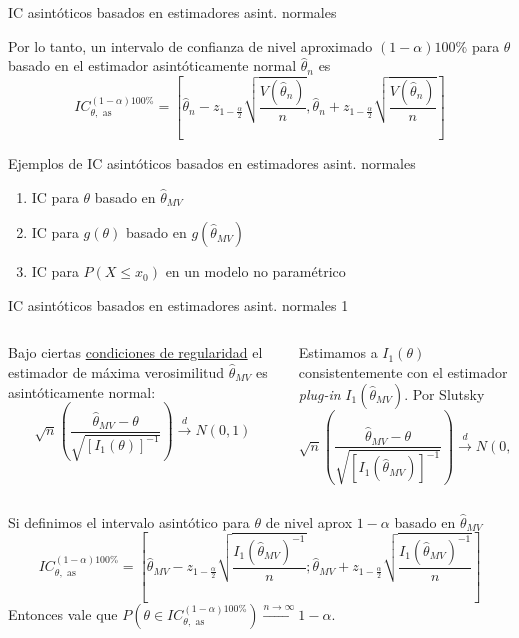 \documentclass{beamer}
\theoremstyle{definition}
\newcommand{\cw}{\overset{d}{\rightarrow}}
\begin{document}
\begin{frame}{\color{rosee}IC asint\'oticos basados en estimadores asint. normales} 

Por lo tanto, un intervalo de confianza de nivel aproximado $(1-\alpha)100\%$ para $\theta$ basado en el estimador asintóticamente normal $\widehat{\theta}_n$ es 
  \[IC_{\theta, \text{ as}}^{(1-\alpha)100\%}=\left[
  \widehat{\theta}_{n} - z_{1-\frac{\alpha}{2}} \sqrt{\frac{V(\widehat{\theta}_{n})}{n}},\widehat{\theta}_{n} + z_{1-\frac{\alpha}{2}} \sqrt{\frac{V(\widehat{\theta}_{n})}{n}}\right]
  \]

  \bigskip
  
Ejemplos de IC asint\'oticos basados en estimadores asint. normales
  \begin{enumerate}
      \item IC para $\theta$ basado en $\widehat{\theta}_{MV}$
      \item IC para $g(\theta)$ basado en $g(\widehat{\theta}_{MV})$
      \item IC para $P(X\leq x_0)$ en un modelo no paramétrico
      
  \end{enumerate}
\end{frame}

\begin{frame}{\color{rosee}IC asint\'oticos basados en estimadores asint. normales 1}\small
\begin{columns}
  \begin{column}[t]{0.48\textwidth}\color{gray}
        Bajo ciertas \underline{condiciones de regularidad} el estimador de
    m\'axima verosimilitud $\widehat{\theta}_{MV}$ es asint\'oticamente normal:
    \[\sqrt{n} \left(\frac{\widehat{\theta}_{MV}-\theta}
        {\sqrt{[I_1(\theta)]^{-1}}}\right)\cw N\left(0,1\right)\]
  \end{column}
    \begin{column}[t]{0.48\textwidth}
    \color{gray}
       Estimamos a $I_{1}(\theta)$ consistentemente con   el estimador \textit{plug-in} $I_{1}(\widehat{\theta}_{MV})$. Por Slutsky
       \[\sqrt{n} \left(\frac{\widehat{\theta}_{MV}-\theta}
        {\sqrt{[I_{1}(\widehat{\theta}_{MV})]^{-1}}}\right)\cw N\left(0,1\right)\] 
  \end{column}
  \end{columns}
  
  \vspace{12pt}
 Si definimos el intervalo asintótico para $\theta$ de nivel aprox $1-\alpha$ basado en $\widehat{\theta}_{MV}$
    \[IC_{\theta, \text{ as}}^{(1-\alpha)100\%}= \left [\widehat{\theta}_{MV}-z_{1-\frac{\alpha}{2}}
        \sqrt{\frac{I_1\left(\widehat{\theta}_{MV}\right)^{-1}}{n}};
        \widehat{\theta}_{MV}+z_{1-\frac{\alpha}{2}}
        \sqrt{\frac{I_1\left(\widehat{\theta}_{MV}\right)^{-1}}{n}}
      \right]\]
    Entonces vale que 
    $P\left(\theta \in IC_{\theta, \text{ as}}^{(1-\alpha)100\%}\right) \stackrel{n \rightarrow \infty}{\longrightarrow} 1-\alpha$.
  
\end{frame}
\end{document}

